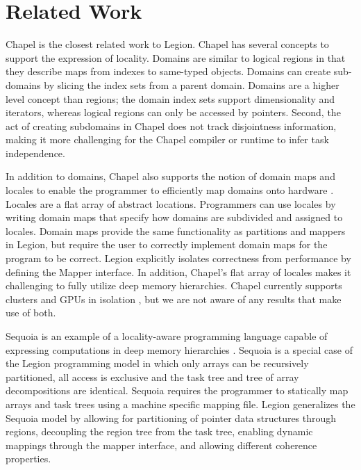 
\section{Related Work}
\label{sec:related}

Chapel \cite{Chamberlain:Chapel} is the closest related work to Legion.  
Chapel has several concepts to support the expression of locality.  
Domains are similar to logical regions in that they describe maps from indexes
to same-typed objects.  Domains can create sub-domains by slicing the index sets from
a parent domain.  Domains are a higher level concept than regions; the domain index sets 
support dimensionality and iterators, whereas  logical regions can only be accessed by pointers.  
Second, the act of creating subdomains in Chapel does not track disjointness information,
making it more challenging for the Chapel compiler or runtime to infer task independence.

In addition to domains, Chapel also supports the notion of domain maps and locales to enable 
the programmer to efficiently map domains onto hardware \cite{CHAPEL11}.  Locales are a flat array
of abstract locations.  Programmers can use locales by writing domain maps that specify
how domains are subdivided and assigned to locales.  Domain maps provide the same functionality
as partitions and mappers in Legion, but require the user to correctly implement domain
maps for the program to be correct.  Legion explicitly isolates correctness
from performance by defining the Mapper interface.  In addition, Chapel's flat array of locales
makes it challenging to fully utilize deep memory hierarchies.  Chapel currently supports
clusters and GPUs in isolation \cite{CHAPELGPU}, but we are not aware of any results that 
make use of both.

Sequoia is an example of a locality-aware programming language capable
of expressing computations in deep memory hierarchies
\cite{Fatahalian06}.  Sequoia is a special case of the Legion
programming model in which only arrays can be recursively partitioned,
all access is exclusive and the task tree and tree of array
decompositions are identical.  Sequoia requires the programmer to
statically map arrays and task trees using a machine specific mapping
file.  Legion generalizes the Sequoia model by allowing for
partitioning of pointer data structures through regions, decoupling
the region tree from the task tree, enabling dynamic mappings through
the mapper interface, and allowing different coherence
properties. 

